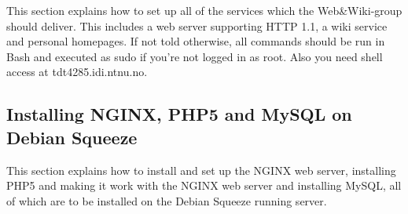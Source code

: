 This section explains how to set up all of the services which the Web\&Wiki-group should deliver. This includes a web server supporting HTTP 1.1, a wiki service and personal homepages. If not told otherwise, all commands should be run in Bash and executed as sudo if you're not logged in as root. Also you need shell access at tdt4285.idi.ntnu.no.

\subsection {Installing NGINX, PHP5 and MySQL on Debian Squeeze}
This section explains how to install and set up the NGINX web server, installing PHP5 and making it work with the NGINX web server and installing MySQL, all of which are to be installed on the Debian Squeeze running server.

